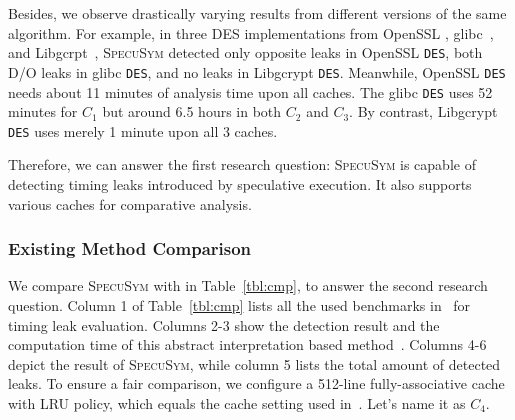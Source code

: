 \documentclass[sigconf]{acmart}
\newcommand{\SpecuSym}{\textsc{SpecuSym} }
\begin{document}
Besides, we observe drastically varying results from different versions of the 
same algorithm. For example, in three DES implementations from OpenSSL
\cite{OpenSSL111c}, glibc~\cite{glibc}, and Libgcrpt~\cite{Libgcrypt}, 
\SpecuSym detected only opposite leaks in OpenSSL \texttt{DES}, both D/O 
leaks in glibc \texttt{DES}, and no leaks in Libgcrypt \texttt{DES}. Meanwhile, 
OpenSSL \texttt{DES} needs about 11 minutes of analysis time upon all caches. 
The glibc \texttt{DES} uses 52 minutes for $C_1$ but around 6.5 hours in both 
$C_2$ and $C_3$. By contrast, Libgcrypt \texttt{DES} uses merely 1 minute upon 
all 3 caches. 


Therefore, we can answer the first research question: \SpecuSym is capable of 
detecting timing leaks introduced by speculative execution. It also supports 
various caches for comparative analysis.


\subsubsection{Existing Method Comparison}
\label{sec:comparison}

We compare \SpecuSym with \cite{WuW19} in Table~\ref{tbl:cmp}, to answer the 
second research question. Column 1 of Table~\ref{tbl:cmp} lists all the used
benchmarks in~\cite{WuW19} for timing leak evaluation. Columns 2-3 show the 
detection result and the computation time of this abstract interpretation 
based method~\cite{WuW19}. Columns 4-6 depict the result of \textsc{SpecuSym}, 
while column 5 lists the total amount of detected leaks. To ensure a fair 
comparison, we configure a 512-line fully-associative cache with LRU policy, 
which equals the cache setting used in~\cite{WuW19}. Let's name it as $C_4$.
\end{document}
